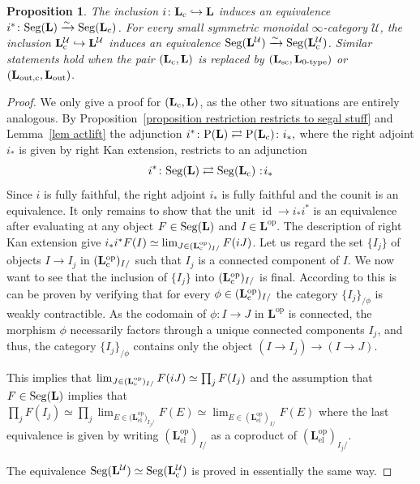 \documentclass{amsart}
\numberwithin{theorem}{subsection}
\newtheorem{proposition}[theorem]{Proposition}
\theoremstyle{definition}
\providecommand{\op}{\mathrm{op}}
\providecommand{\xel}{\mathrm{el}}
\newcommand{\xU}{\mathcal{U}}
\newcommand{\id}{\operatorname{id}}
\newcommand{\Pre}{\name{P}}
\newcommand*\cocolon{%
	\nobreak
	\mskip6mu plus1mu
	\mathpunct{}%
	\nonscript
	\mkern-\thinmuskip
	{:}%
	\mskip2mu
	\relax
}
\newcommand{\isoto}{\xrightarrow{\sim}}
\newcommand{\name}[1]{\ensuremath{\text{\textup{#1}}}}
\newcommand{\levelg}{\mathbf{L}}
\newcommand{\levelU}{\levelg^\xU}
\newcommand{\levelgconn}{\levelg_{\name{c}}}
\newcommand{\levelcU}{\levelgconn^{\xU}}
\newcommand{\Seg}{\name{Seg}}
\begin{document}
\begin{proposition}\label{proposition LcL}
The inclusion $i\colon\levelgconn \hookrightarrow \levelg$  induces an equivalence $i^*\colon \Seg(\levelg)\isoto\Seg(\levelgconn)$. 
For every small symmetric monoidal $\infty$-category $\xU$, the inclusion $\levelcU \hookrightarrow \levelU$ induces an equivalence $\Seg(\levelU)\isoto\Seg(\levelcU)$.
Similar statements hold when the pair $(\levelgconn, \levelg)$ is replaced by $(\levelg_{\name{sc}},\levelg_{\name{0-type}})$ or $(\levelg_{\name{out,c}},\levelg_{\name{out}})$.
\end{proposition}
\begin{proof}
We only give a proof for $(\levelgconn, \levelg)$, as the other two situations are entirely analogous. 
By Proposition~\ref{proposition restriction restricts to segal stuff} and Lemma~\ref{lem actlift} the adjunction
$i^*\colon \Pre(\levelg)\rightleftarrows \Pre(\levelgconn)\colon i_*,$ where the right adjoint $i_*$ is given by right Kan extension, restricts to an adjunction
\[i^*\colon \Seg(\levelg)\rightleftarrows \Seg(\levelgconn)\cocolon i_*\]
Since $i$ is fully faithful, the right adjoint $i_*$ is fully faithful and the counit is an equivalence. It only remains to show that the unit $\id \to i_*i^*$ is an equivalence after evaluating at any object $F\in \Seg(\levelg)$ and $I\in \levelg^\op$. 
The description of right Kan extension give $i_*i^*F(I)\simeq \lim_{J\in (\levelgconn^\op)_{I/}}F(iJ)$. Let us regard the set $\{I_j\}$ of objects $I\to I_j$ in $(\levelgconn^\op)_{I/}$ such that $I_j$ is a connected component of $I$. 
We now want to see that the inclusion of $\{I_j\}$ into $(\levelgconn^\op)_{I/}$ is final. 
According to \cite[Theorem 4.1.3.1]{ht} this is can be proven by verifying that for every $\phi\in (\levelgconn^\op)_{I/}$ the category $\{I_j\}_{/\phi}$ is weakly contractible. 
As the codomain of $\phi\colon I\to J$ in $\levelg^\op$ is connected, the morphism $\phi$ necessarily factors through a unique connected components $I_j$, and thus, the category $\{I_j\}_{/\phi}$ contains only the object $(I \to I_j) \to (I \to J)$.

This implies that $\lim_{J\in (\levelgconn^\op)_{I/}}F(iJ)\simeq \prod_{j}F(I_j)$ and the assumption that $F\in \Seg(\levelg)$ implies that $\prod_{j}F(I_j)\simeq \prod_{j}\lim_{E\in {(\levelg_{\xel}^\op})_{I_j/}}F(E)\simeq \lim_{E\in{(\levelg_{\xel}^\op)}_{I/}}F(E)$ where the last equivalence is given by writing ${(\levelg_{\xel}^\op)}_{I/}$ as a coproduct of ${(\levelg_{\xel}^\op)}_{I_j/}$.

The equivalence $\Seg(\levelU)\simeq \Seg(\levelcU)$ is proved in essentially the same way.
\end{proof}
\end{document}
